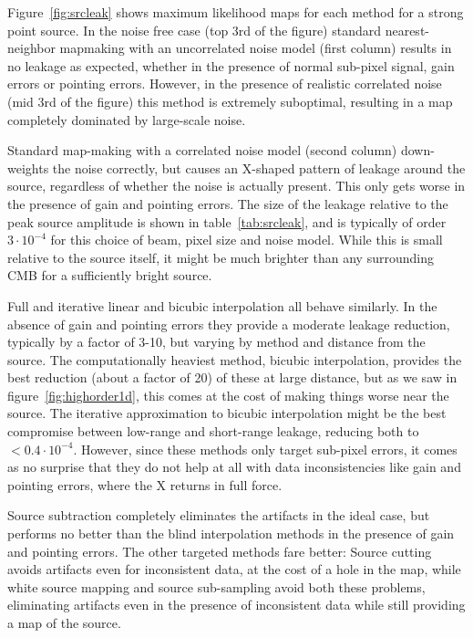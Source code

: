 \documentclass{article}
\begin{document}
Figure~\ref{fig:srcleak} shows maximum likelihood maps for each method for a strong point source.
In the noise free case (top 3rd of the figure) standard nearest-neighbor mapmaking
with an uncorrelated noise model (first column) results in no leakage as expected, whether in the
presence of normal sub-pixel signal, gain errors or pointing errors. However, in the presence
of realistic correlated noise (mid 3rd of the figure) this method is extremely suboptimal,
resulting in a map completely
dominated by large-scale noise.

Standard map-making with a correlated noise model (second column)
down-weights the noise correctly, but causes an X-shaped pattern of leakage around the
source, regardless of whether the noise is actually present. This only gets worse in
the presence of gain and pointing errors. The size of the leakage relative to
the peak source amplitude is shown in table~\ref{tab:srcleak}, and is typically of order $3\cdot 10^{-4}$ for
this choice of beam, pixel size and noise model. While
this is small relative to the source itself, it might be much brighter than any
surrounding CMB for a sufficiently bright source.

Full and iterative linear and bicubic interpolation all behave similarly.
In the absence of gain and pointing errors they provide a moderate leakage reduction,
typically by a factor of 3-10, but varying by method and distance from the source.
The computationally heaviest method, bicubic interpolation, provides the best reduction (about a factor
of 20) of these at large distance, but as we saw in figure~\ref{fig:highorder1d}, this comes at the cost of making
things worse near the source.
The iterative approximation to bicubic interpolation might be the best compromise
between low-range and short-range leakage, reducing both to $<0.4 \cdot 10^{-4}$.
However, since these methods only target sub-pixel
errors, it comes as no surprise that they do not help at all with data inconsistencies
like gain and pointing errors, where the X returns in full force.

Source subtraction completely eliminates the artifacts in the ideal case, but
performs no better than the blind interpolation methods in the presence of gain
and pointing errors. The other targeted methods fare better:
Source cutting avoids artifacts even for inconsistent data, at the cost of a hole in the map,
while white source mapping and source sub-sampling avoid both these problems,
eliminating artifacts even in the presence of inconsistent data while still providing
a map of the source.
\end{document}
